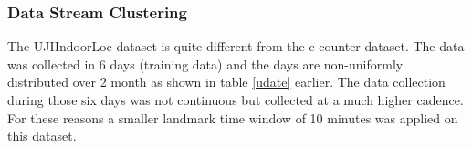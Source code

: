 \begin{itemize}



\end{itemize}


\subsubsection{Data Stream Clustering} 
The UJIIndoorLoc dataset is quite different from the e-counter dataset. The data was collected in 6 days (training data) and the days are non-uniformly distributed over 2 month as shown in table \ref{udate} earlier. The data collection during those six days was not continuous but collected at a much higher cadence. For these reasons a smaller landmark time window of 10 minutes was applied on this dataset.

